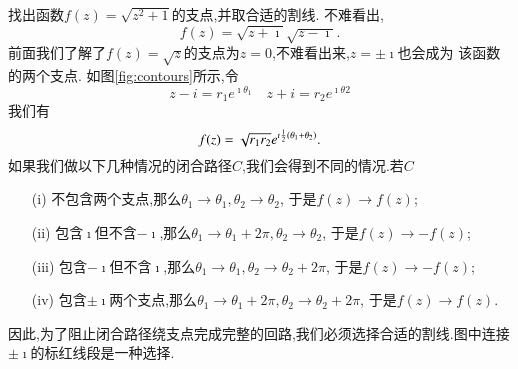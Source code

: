 \begin{examplebox}{找出函数$f(z) = \sqrt{z^2 + 1}$的支点,并取合适的割线.}
不难看出,
\[
  f(z) = \sqrt{z + \imath} \sqrt{z-\imath} .
\]
前面我们了解了$f(z)=\sqrt{z}$的支点为$z=0$,不难看出来,$z=\pm \imath$也会成为
该函数的两个支点.
如图\ref{fig:contours}所示,令
\[ z - i = r_1 e^{\imath \theta_1 } \quad 
    z + i = r_2 e^{\imath \theta 2}
\]
我们有\[f(z) = \sqrt{r_1 r_2} e^{\imath {\frac{1}{2}} (\theta_1 + \theta_2)}.\]
如果我们做以下几种情况的闭合路径$C$,我们会得到不同的情况.若$C$
\begin{enumerate}
    \item[(i)] 不包含两个支点,那么$\theta_1 \to \theta_1, \theta_2 \to \theta_2$, 于是$f(z)\to f(z)$;
    \item[(ii)] 包含$\imath$但不含$-\imath$,那么$\theta_1 \to \theta_1 + 2\pi, \theta_2 \to \theta_2$, 于是$f(z)\to - f(z)$;
    \item[(iii)] 包含$-\imath$但不含$\imath$,那么$\theta_1 \to \theta_1, \theta_2 \to \theta_2  + 2\pi$, 于是$f(z)\to - f(z)$;
    \item[(iv)] 包含$\pm \imath$两个支点,那么$\theta_1 \to \theta_1  + 2\pi, \theta_2 \to \theta_2  + 2\pi$, 于是$f(z)\to  f(z)$.
\end{enumerate}
因此,为了阻止闭合路径绕支点完成完整的回路,我们必须选择合适的割线.图中连接$\pm \imath$的标红线段是一种选择.
\end{examplebox}